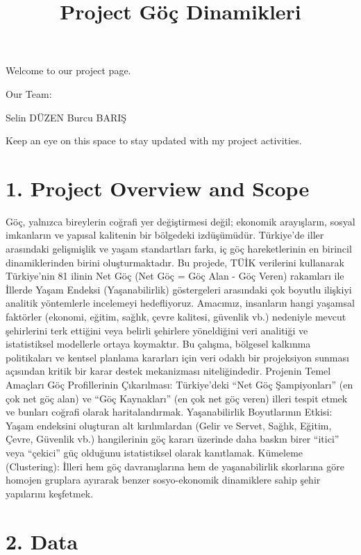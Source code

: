 \documentclass[
  11pt,
  a4paper,
  DIV=11,
  numbers=noendperiod]{scrartcl}
\title{Project Göç Dinamikleri}
\author{}
\date{}
\begin{document}
\maketitle


Welcome to our project page.

Our Team:

Selin DÜZEN Burcu BARIŞ

Keep an eye on this space to stay updated with my project activities.

\section{1. Project Overview and
Scope}\label{project-overview-and-scope}

Göç, yalnızca bireylerin coğrafi yer değiştirmesi değil; ekonomik
arayışların, sosyal imkanların ve yapısal kalitenin bir bölgedeki
izdüşümüdür. Türkiye'de iller arasındaki gelişmişlik ve yaşam
standartları farkı, iç göç hareketlerinin en birincil dinamiklerinden
birini oluşturmaktadır. Bu projede, TÜİK verilerini kullanarak
Türkiye'nin 81 ilinin Net Göç (Net Göç = Göç Alan - Göç Veren) rakamları
ile İllerde Yaşam Endeksi (Yaşanabilirlik) göstergeleri arasındaki çok
boyutlu ilişkiyi analitik yöntemlerle incelemeyi hedefliyoruz. Amacımız,
insanların hangi yaşamsal faktörler (ekonomi, eğitim, sağlık, çevre
kalitesi, güvenlik vb.) nedeniyle mevcut şehirlerini terk ettiğini veya
belirli şehirlere yöneldiğini veri analitiği ve istatistiksel modellerle
ortaya koymaktır. Bu çalışma, bölgesel kalkınma politikaları ve kentsel
planlama kararları için veri odaklı bir projeksiyon sunması açısından
kritik bir karar destek mekanizması niteliğindedir. Projenin Temel
Amaçları Göç Profillerinin Çıkarılması: Türkiye'deki ``Net Göç
Şampiyonları'' (en çok net göç alan) ve ``Göç Kaynakları'' (en çok net
göç veren) illeri tespit etmek ve bunları coğrafi olarak
haritalandırmak. Yaşanabilirlik Boyutlarının Etkisi: Yaşam endeksini
oluşturan alt kırılımlardan (Gelir ve Servet, Sağlık, Eğitim, Çevre,
Güvenlik vb.) hangilerinin göç kararı üzerinde daha baskın birer
``itici'' veya ``çekici'' güç olduğunu istatistiksel olarak kanıtlamak.
Kümeleme (Clustering): İlleri hem göç davranışlarına hem de
yaşanabilirlik skorlarına göre homojen gruplara ayırarak benzer
sosyo-ekonomik dinamiklere sahip şehir yapılarını keşfetmek.

\section{2. Data}\label{data}
\end{document}
